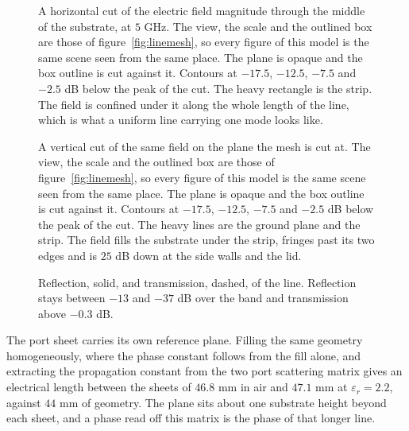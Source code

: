 \documentclass[11pt]{article}
\begin{document}
\begin{figure}[H]
\centering
\begin{tikzpicture}

\end{tikzpicture}
\caption{A horizontal cut of the electric field magnitude through the middle of the substrate, at \(5\) GHz. The view, the scale and the outlined box are those of figure~\ref{fig:linemesh}, so every figure of this model is the same scene seen from the same place. The plane is opaque and the box outline is cut against it. Contours at \(-17.5\), \(-12.5\), \(-7.5\) and \(-2.5\) dB below the peak of the cut. The heavy rectangle is the strip. The field is confined under it along the whole length of the line, which is what a uniform line carrying one mode looks like.}
\label{fig:lineh}
\end{figure}

\begin{figure}[H]
\centering
\begin{tikzpicture}

\end{tikzpicture}
\caption{A vertical cut of the same field on the plane the mesh is cut at. The view, the scale and the outlined box are those of figure~\ref{fig:linemesh}, so every figure of this model is the same scene seen from the same place. The plane is opaque and the box outline is cut against it. Contours at \(-17.5\), \(-12.5\), \(-7.5\) and \(-2.5\) dB below the peak of the cut. The heavy lines are the ground plane and the strip. The field fills the substrate under the strip, fringes past its two edges and is \(25\) dB down at the side walls and the lid.}
\label{fig:linev}
\end{figure}

\begin{figure}[H]
\centering
{}
\caption{Reflection, solid, and transmission, dashed, of the line. Reflection
stays between \(-13\) and \(-37\) dB over the band and transmission above
\(-0.3\) dB.}
\label{fig:lines}
\end{figure}

The port sheet carries its own reference plane. Filling the same geometry
homogeneously, where the phase constant follows from the fill alone, and
extracting the propagation constant from the two port scattering matrix
gives an electrical length between the sheets of \(46.8\) mm in air and
\(47.1\) mm at \(\varepsilon_r = 2.2\), against \(44\) mm of geometry.
The plane sits about one substrate height beyond each sheet, and a phase
read off this matrix is the phase of that longer line.
\end{document}
